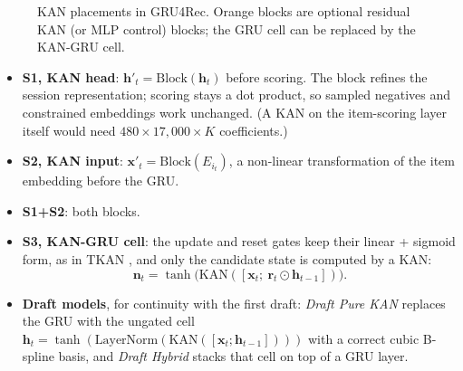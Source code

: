 \begin{figure}[H]
\centering
{}
\caption{KAN placements in GRU4Rec. Orange blocks are optional residual KAN (or
MLP control) blocks; the GRU cell can be replaced by the KAN-GRU cell.}
\label{fig:placements}
\end{figure}

\begin{itemize}
    \item \textbf{S1, KAN head}: $\mathbf{h}'_t = \mathrm{Block}(\mathbf{h}_t)$
          before scoring. The block refines the session representation; scoring
          stays a dot product, so sampled negatives and constrained embeddings
          work unchanged. (A KAN on the item-scoring layer itself would need
          $480 \times 17{,}000 \times K$ coefficients.)
    \item \textbf{S2, KAN input}: $\mathbf{x}'_t = \mathrm{Block}(E_{i_t})$, a
          non-linear transformation of the item embedding before the GRU.
    \item \textbf{S1+S2}: both blocks.
    \item \textbf{S3, KAN-GRU cell}: the update and reset gates keep their linear
          + sigmoid form, as in TKAN \cite{genet2024}, and only the candidate
          state is computed by a KAN:
          \begin{equation}
          \mathbf{n}_t = \tanh\big(\mathrm{KAN}([\mathbf{x}_t;\ \mathbf{r}_t \odot \mathbf{h}_{t-1}])\big).
          \end{equation}
    \item \textbf{Draft models}, for continuity with the first draft:
          \emph{Draft Pure KAN} replaces the GRU with the ungated cell
          $\mathbf{h}_t = \tanh(\mathrm{LayerNorm}(\mathrm{KAN}([\mathbf{x}_t;\mathbf{h}_{t-1}])))$
          with a correct cubic B-spline basis, and \emph{Draft Hybrid} stacks that
          cell on top of a GRU layer.
\end{itemize}

